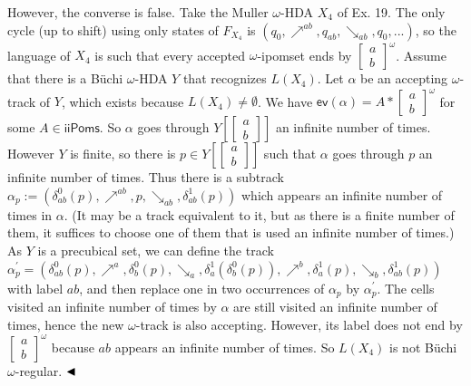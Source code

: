 \documentclass[10pt,a4paper]{article}
\begin{document}
However, the converse is false. Take the Muller $\omega$-HDA $X_{4}$ of Ex. 19. The only cycle (up to shift) using only states of $F_{X_{4}}$ is $(q_{0},\mathrel{\nearrow^{ab}},q_{ab},\mathrel{\searrow_{ab}},q_{0},...)$, so the language of $X_{4}$ is such that every accepted $\omega$-ipomset ends by $\left[\begin{smallmatrix}a\\
b\end{smallmatrix}\right]^{\omega}$. Assume that there is a Büchi $\omega$-HDA $Y$ that recognizes $L(X_{4})$. Let $\alpha$ be an accepting $\omega$-track of $Y$, which exists because $L(X_{4})\neq\emptyset$. We have $\mathsf{ev}(\alpha)=A*\left[\begin{smallmatrix}a\\
b\end{smallmatrix}\right]^{\omega}$ for some $A\in\mathsf{iiPoms}$. So $\alpha$ goes through $Y[\left[\begin{smallmatrix}a\\
b\end{smallmatrix}\right]]$ an infinite number of times. However $Y$ is finite, so there is $p\in Y[\left[\begin{smallmatrix}a\\
b\end{smallmatrix}\right]]$ such that $\alpha$ goes through $p$ an infinite number of times. Thus there is a subtrack $\alpha_{p}:=(\delta^{0}_{ab}(p),\mathrel{\nearrow^{ab}},p,\mathrel{\searrow_{ab}},\delta^{1}_{ab}(p))$ which appears an infinite number of times in $\alpha$. (It may be a track equivalent to it, but as there is a finite number of them, it suffices to choose one of them that is used an infinite number of times.) As $Y$ is a precubical set, we can define the track $\alpha^{\prime}_{p}=(\delta^{0}_{ab}(p),\mathrel{\nearrow^{a}},\delta^{0}_{b}(p),\mathrel{\searrow_{a}},\delta^{1}_{a}(\delta^{0}_{b}(p)),\mathrel{\nearrow^{b}},\delta^{1}_{a}(p),\mathrel{\searrow_{b}},\delta^{1}_{ab}(p))$ with label $ab$, and then replace one in two occurrences of $\alpha_{p}$ by $\alpha^{\prime}_{p}$. The cells visited an infinite number of times by $\alpha$ are still visited an infinite number of times, hence the new $\omega$-track is also accepting. However, its label does not end by $\left[\begin{smallmatrix}a\\
b\end{smallmatrix}\right]^{\omega}$ because $ab$ appears an infinite number of times. So $L(X_{4})$ is not Büchi $\omega$-regular. $\hfill\blacktriangleleft$\par
 
\end{document}
